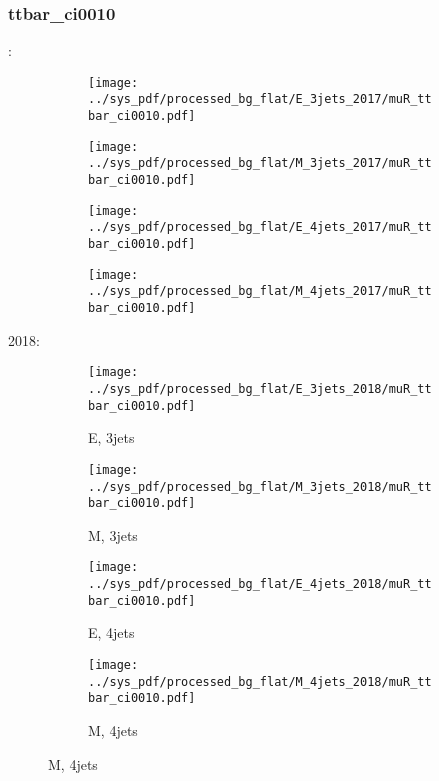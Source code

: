 \documentclass{beamer}
\begin{document}
\begin{frame}
\frametitle{ttbar_ci0010}
\fontsize{5}{1}:
\begin{figure}
\centering
\begin{subfigure}[b]{0.24\textwidth}
\texttt{[image: ../sys\_pdf/processed\_bg\_flat/E\_3jets\_2017/muR\_ttbar\_ci0010.pdf]}
\end{subfigure}
\begin{subfigure}[b]{0.24\textwidth}
\texttt{[image: ../sys\_pdf/processed\_bg\_flat/M\_3jets\_2017/muR\_ttbar\_ci0010.pdf]}
\end{subfigure}
\begin{subfigure}[b]{0.24\textwidth}
\texttt{[image: ../sys\_pdf/processed\_bg\_flat/E\_4jets\_2017/muR\_ttbar\_ci0010.pdf]}
\end{subfigure}
\begin{subfigure}[b]{0.24\textwidth}
\texttt{[image: ../sys\_pdf/processed\_bg\_flat/M\_4jets\_2017/muR\_ttbar\_ci0010.pdf]}
\end{subfigure}
\end{figure}
2018:
\begin{figure}
\centering
\begin{subfigure}[b]{0.24\textwidth}
\texttt{[image: ../sys\_pdf/processed\_bg\_flat/E\_3jets\_2018/muR\_ttbar\_ci0010.pdf]}
\captionsetup{font=tiny}
\caption{E, 3jets}
\end{subfigure}
\begin{subfigure}[b]{0.24\textwidth}
\texttt{[image: ../sys\_pdf/processed\_bg\_flat/M\_3jets\_2018/muR\_ttbar\_ci0010.pdf]}
\captionsetup{font=tiny}
\caption{M, 3jets}
\end{subfigure}
\begin{subfigure}[b]{0.24\textwidth}
\texttt{[image: ../sys\_pdf/processed\_bg\_flat/E\_4jets\_2018/muR\_ttbar\_ci0010.pdf]}
\captionsetup{font=tiny}
\caption{E, 4jets}
\end{subfigure}
\begin{subfigure}[b]{0.24\textwidth}
\texttt{[image: ../sys\_pdf/processed\_bg\_flat/M\_4jets\_2018/muR\_ttbar\_ci0010.pdf]}
\captionsetup{font=tiny}
\caption{M, 4jets}
\end{subfigure}
\end{figure}
\end{frame}
\end{document}

